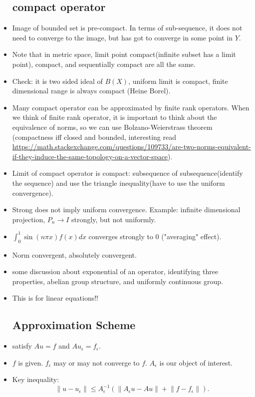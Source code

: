 \documentclass{article}
\theoremstyle{remark}
\begin{document}
\begin{itemize}
\subsection*{compact operator}
\item Image of bounded set is pre-compact. In terms of sub-sequence, it does not need to converge to the image, but has got to converge in some point in $Y$.
\item Note that in metric space, limit point compact(infinite subset has a limit point), compact, and sequentially compact are all the same.
\item Check: it is two sided ideal of $B(X)$, uniform limit is compact, finite dimensional range is always compact (Heine Borel).
\item Many compact operator can be approximated by finite rank operators. When we think of finite rank operator, it is important to think about the equivalence of norms, so we can use Bolzano-Weierstrass theorem (compactness iff closed and bounded, interesting read \url{https://math.stackexchange.com/questions/109733/are-two-norms-equivalent-if-they-induce-the-same-topology-on-a-vector-space}).
\item Limit of compact operator is compact: subsequence of subsequence(identify the sequence) and use the triangle inequality(have to use the uniform convergence).
\item Strong does not imply uniform convergence. Example: infinite dimensional projection, $P_n\to I$ strongly, but not uniformly.
\item $\int_0^1 \sin(n\pi x)f(x)dx$ converges strongly to $0$ ("averaging" effect).
\item Norm convergent, absolutely convergent.
\item some discussion about exponential of an operator, identifying three properties, abelian group structure, and uniformly continuous group.
\item This is for linear equations!!
\subsection*{Approximation Scheme}
\item satisfy $Au=f$ and $Au_\epsilon=f_\epsilon$.
\item $f$ is given. $f_\epsilon$ may or may not converge to $f$. $A_\epsilon$ is our object of interest. 
\item Key inequality: $$\lVert u-u_\epsilon\rVert\leq A_\epsilon^{-1}(\lVert A_\epsilon u-Au\rVert +\lVert f-f_\epsilon\rVert).$$

\end{itemize}
\end{document}
